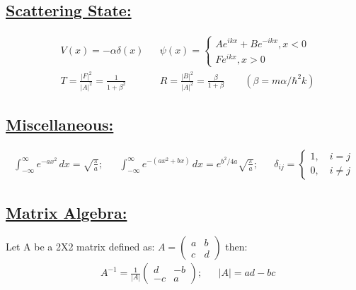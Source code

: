 \documentclass[a4paper,12pt]{article}
\begin{document}
\subsection*{\underline{Scattering State:}}
\begin{align}
    &V(x)=-\alpha\delta(x)
    &
    &\psi(x)=\left\{\begin{matrix}Ae^{ikx}+Be^{-ikx}, x<0\\Fe^{ikx}, x>0\end{matrix}\right.
    \\
    &T=\frac{|F|^2}{|A|^2}=\frac{1}{1+\beta^2}
    &
    &R=\frac{|B|^2}{|A|^2}=\frac{\beta}{1+\beta}\qquad (\beta=m\alpha/\hbar^2k)
\end{align}
\subsection*{\underline{Miscellaneous:}}
\begin{align}
    \int_{-\infty}^\infty e^{-ax^2}\, dx=\sqrt{\frac{\pi}{a}};
    &&
    \int_{-\infty}^\infty e^{-(ax^2+bx)}\,dx=e^{b^2/4a}\sqrt{\frac{\pi}{a}};
    &&
    \delta_{ij}=\left\{
        \begin{matrix}
            1,\quad i=j\\
            0,\quad i\neq j
        \end{matrix}
    \right.
\end{align}
\subsection*{\underline{Matrix Algebra:}}
Let A be a 2X2 matrix defined as:
     $A=\left(
        \begin{matrix}
            a     &b\\
            c     &d
        \end{matrix}
    \right)$ then:
\begin{align}
    &A^{-1}=\frac{1}{|A|}\left(
        \begin{matrix}
            d     &-b\\
            -c     &a
        \end{matrix}
    \right);
    &&|A| = ad-bc
\end{align}
\end{document}

